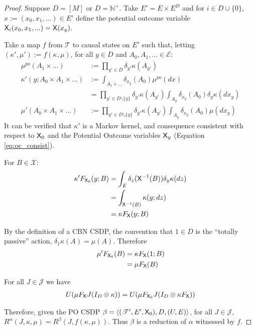 \begin{proof}
Suppose $D=[M]$ or $D=\mathbb{N}^+$. Take $E' = E\times E^D$ and for $i\in D\cup\{0\}$, $x:=(x_0,x_1,...)\in E'$ define the potential outcome variable $\mathsf{X}_i(x_0,x_1,...) = \mathsf{X}(x_y)$. 

Take a map $f$ from $\mathscr{T}$ to causal states on $E'$ such that, letting $(\kappa',\mu'):=f(\kappa,\mu)$, for all $y\in D$ and $A_0,A_1, ...\in\mathcal{E}$:
\begin{align}
    \mu^{po}(A_1\times...) &:= \prod_{y'\in D} \delta_{y'} \kappa (A_{y'})\\
    \kappa' (y; A_0\times A_1\times...) &:= \int_{A_1\times ...} \delta_{x_y} (A_0) \mu^{po}(dx) \\
    &= \prod_{y'\in D\setminus\{y\}} \delta_{y'} \kappa (A_{y'}) \int_{A_y} \delta_{x_y} (A_0) \delta_y \kappa(dx_y)\\
    \mu' ( A_0\times A_1\times...) &:= \prod_{y'\in D\setminus\{y\}} \delta_{y'} \kappa (A_{y'}) \int_{A_y} \delta_{x_y} (A_0) \mu(dx_y) \label{eq:consist}
\end{align}
It can be verified that $\kappa'$ is a Markov kernel, and consequence consistent with respect to $\mathsf{X}_0$ and the Potential Outcome variables $\mathsf{X}_y$ (Equation \ref{eq:oc_consist}).

For $B\in \mathcal{X}$:
\begin{align}
    \kappa' F_{\mathsf{X}_0} (y;B) &= \int_E \delta_{z} (\mathsf{X}^{-1}(B)) \delta_y \kappa (dz)\\
                               &= \int_{\mathsf{X}^{-1}(B)} \kappa(y;dz)\\
                               &= \kappa F_{\mathsf{X}} (y;B)
\end{align}


By the definition of a CBN CSDP, the convention that $1\in D$ is the ``totally passive'' action, $\delta_1 \kappa (A) =\mu (A)$. Therefore
\begin{align}
    \mu' F_{\mathsf{X}_0} (B) &= \kappa F_{\mathsf{X}} (1;B)\\
                          &= \mu F_{\mathsf{X}} (B)
\end{align}

For all $J\in \mathscr{J}$ we have
\begin{align}
    U(\mu F_{\mathsf{X}} J(I_D\otimes \kappa)) = U(\mu F_{\mathsf{X}_0} J(I_D\otimes \kappa F_{\mathsf{X}}))\\
\end{align}

Therefore, given the PO CSDP $\beta=\langle (\mathscr{T}',E',\mathsf{X}_0),D,(U,E) \rangle$, for all $J\in \mathscr{J}$, $R^\alpha(J,\kappa,\mu)=R^\beta(J,f(\kappa,\mu))$. Thus $\beta$  is a reduction of $\alpha$ witnessed by $f$.
\end{proof}

